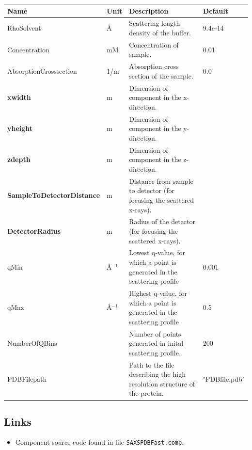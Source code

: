 \begin{longtable}{p{}p{}p{}p{}}
\toprule
\textbf{Name} & \textbf{Unit} & \textbf{Description} & \textbf{Default} \\
\midrule
\endhead
RhoSolvent & \AA{} & Scattering length density of the buffer. & 9.4e-14 \\
Concentration & mM & Concentration of sample. & 0.01 \\
AbsorptionCrosssection & 1/m & Absorption cross section of the sample. & 0.0 \\
\textbf{xwidth} & m & Dimension of component in the x-direction. &  \\
\textbf{yheight} & m & Dimension of component in the y-direction. &  \\
\textbf{zdepth} & m & Dimension of component in the z-direction. &  \\
\textbf{SampleToDetectorDistance} & m & Distance from sample to detector (for focusing the scattered x-rays). &  \\
\textbf{DetectorRadius} & m & Radius of the detector (for focusing the scattered x-rays). &  \\
qMin & \AA{}$^{-1}$ & Lowest q-value, for which a point is generated in the scattering profile & 0.001 \\
qMax & \AA{}$^{-1}$ & Highest q-value, for which a point is generated in the scattering profile & 0.5 \\
NumberOfQBins &  & Number of points generated in inital scattering profile. & 200 \\
PDBFilepath &  & Path to the file describing the high resolution structure of the protein. & "PDBfile.pdb" \\
\bottomrule
\end{longtable}

\subsection*{Links}
\begin{itemize}
  \item Component source code found in file \texttt{SAXSPDBFast.comp}.
\end{itemize}
